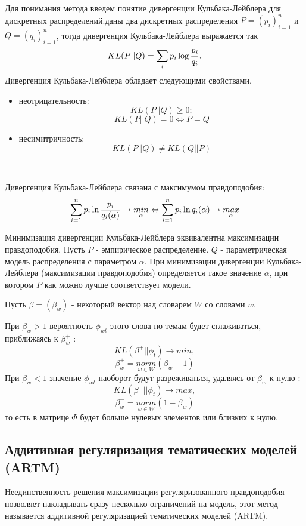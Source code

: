 Для понимания метода введем понятие дивергенции Кульбака-Лейблера для дискретных распределений. даны два дискретных распределения $P=(p_i)_{i=1}^n$ и $Q=(q_i)_{i=1}^n$, тогда дивергенция Кульбака-Лейблера выражается так
$$
KL(P||Q)=\sum_i{p_i \log{{p_i}\over{q_i}}}.
$$
Дивергенция Кульбака-Лейблера обладает следующими свойствами.

\begin{itemize}
    \item неотрицательность:
        $$
        KL(P||Q)\ge 0;
        $$
        $$
        KL(P||Q)=0 \Leftrightarrow P=Q
        $$
    \item несимитричность:
        $$
        KL(P||Q)\neq KL(Q||P)
        $$
\end{itemize}

~\

Дивергенция Кульбака-Лейблера связана с максимумом правдоподобия:
$$
\sum_{i=1}^{n}p_i\ln{p_i \over {q_i(\alpha)}} \rightarrow \underset{\alpha}{min} \Leftrightarrow \sum_{i=1}^{n}p_i\ln{q_i(\alpha)} \rightarrow \underset{\alpha}{max}
$$

Минимизация дивергенции Кульбака-Лейблера эквивалентна максимизации правдоподобия. Пусть $P$ - эмпирическое распределение. $Q$ - параметрическая модель распределения с параметром $\alpha$. При минимизации дивергенции Кульбака-Лейблера (максимизации правдоподобия) определяется такое значение $\alpha$, при котором $P$ как можно лучше соответствует модели.

Пусть $\beta=(\beta_w)$ - некоторый вектор над словарем $W$ со словами $w$.

При $\beta_w>1$ вероятность $\phi_{wt}$ этого слова по темам будет сглаживаться, приближаясь к $\beta_w^+$ : 
$$
KL(\beta^+||\phi_t) \rightarrow min,
$$
$$
\beta_w^+=\underset{w \in W}{norm}(\beta_w-1)
$$
При $\beta_w<1$ значение $\phi_{wt}$ наоборот будут разреживаться, удаляясь от $\beta_w^-$ к нулю : 
$$
KL(\beta^-||\phi_t) \rightarrow max,
$$
$$
\beta_w^-=\underset{w \in W}{norm}(1-\beta_w)
$$
то есть в матрице $\Phi$ будет больше нулевых элементов или близких к нулю.

\subsection{Аддитивная регуляризация тематических моделей (ARTM)}

Неединственность решения максимизации регуляризованного правдоподобия позволяет накладывать сразу несколько ограничений на модель, этот метод называется аддитивной регуляризацией тематических моделей (ARTM).


